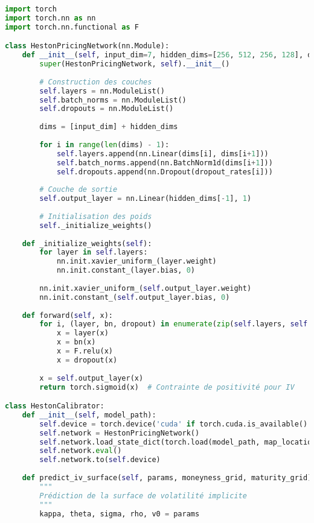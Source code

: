 \begin{lstlisting}[language=Python, caption=Architecture du réseau de neurones]
import torch
import torch.nn as nn
import torch.nn.functional as F

class HestonPricingNetwork(nn.Module):
    def __init__(self, input_dim=7, hidden_dims=[256, 512, 256, 128], dropout_rates=[0.2, 0.2, 0.1, 0.1]):
        super(HestonPricingNetwork, self).__init__()
        
        # Construction des couches
        self.layers = nn.ModuleList()
        self.batch_norms = nn.ModuleList()
        self.dropouts = nn.ModuleList()
        
        dims = [input_dim] + hidden_dims
        
        for i in range(len(dims) - 1):
            self.layers.append(nn.Linear(dims[i], dims[i+1]))
            self.batch_norms.append(nn.BatchNorm1d(dims[i+1]))
            self.dropouts.append(nn.Dropout(dropout_rates[i]))
        
        # Couche de sortie
        self.output_layer = nn.Linear(hidden_dims[-1], 1)
        
        # Initialisation des poids
        self._initialize_weights()
    
    def _initialize_weights(self):
        for layer in self.layers:
            nn.init.xavier_uniform_(layer.weight)
            nn.init.constant_(layer.bias, 0)
        
        nn.init.xavier_uniform_(self.output_layer.weight)
        nn.init.constant_(self.output_layer.bias, 0)
    
    def forward(self, x):
        for i, (layer, bn, dropout) in enumerate(zip(self.layers, self.batch_norms, self.dropouts)):
            x = layer(x)
            x = bn(x)
            x = F.relu(x)
            x = dropout(x)
        
        x = self.output_layer(x)
        return torch.sigmoid(x)  # Contrainte de positivité pour IV

class HestonCalibrator:
    def __init__(self, model_path):
        self.device = torch.device('cuda' if torch.cuda.is_available() else 'cpu')
        self.network = HestonPricingNetwork()
        self.network.load_state_dict(torch.load(model_path, map_location=self.device))
        self.network.eval()
        self.network.to(self.device)
    
    def predict_iv_surface(self, params, moneyness_grid, maturity_grid):
        """
        Prédiction de la surface de volatilité implicite
        """
        kappa, theta, sigma, rho, v0 = params
        

\end{lstlisting}
